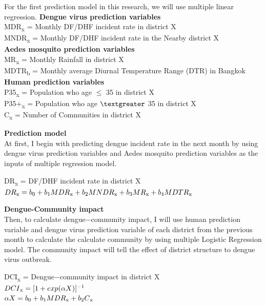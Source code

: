 \documentclass[review]{elsarticle}
\begin{document}
For the first prediction model in this research, we  will use multiple linear regression.
\textbf{Dengue virus prediction variables}\\ 
MDR\textsubscript{x} = Monthly DF/DHF incident rate in district X \\
MNDR\textsubscript{x} = Monthly DF/DHF incident rate in the Nearby district X\\

\textbf{Aedes mosquito prediction variables}\\
MR\textsubscript{x} = Monthly Rainfall in district X\\
MDTR\textsubscript{b} = Monthly average Diurnal Temperature Range (DTR) in Bangkok\\

\textbf{Human prediction variables}\\
P35\textsubscript{x} = Population who age $\leqslant$ 35 in district X\\
P35+\textsubscript{x} = Population who age $\textgreater$ 35 in district X\\
C\textsubscript{x}  = Number of Communities in district X

\textbf{Prediction model}\\
At first, I begin with predicting dengue incident rate in the next month by using dengue virus prediction variables and Aedes mosquito prediction variables as the inputs of multiple regression model.

DR\textsubscript{x} = DF/DHF incident rate in district X \\
$DR\textsubscript{x} = b\textsubscript{0} + b\textsubscript{1}MDR\textsubscript{x} + b\textsubscript{2}MNDR\textsubscript{x} + b\textsubscript{3}MR\textsubscript{x} + b\textsubscript{4}MDTR\textsubscript{x}$

\textbf{Dengue-Community impact}\\
Then, to calculate dengue$-$community impact, I will use human prediction variable and dengue virus prediction variable of each district from the previous month to calculate the calculate community by using multiple Logistic Regression model.
The community impact will tell the effect of district structure to dengue virus outbreak.

DCI\textsubscript{x} = Dengue$-$community impact in district X \\
$DCI\textsubscript{x} = [1 + exp(\alpha X)]^{-1}  $ \\
$\alpha X = b\textsubscript{0} + b\textsubscript{1}MDR\textsubscript{x} + b\textsubscript{2}C\textsubscript{x}$
\end{document}
